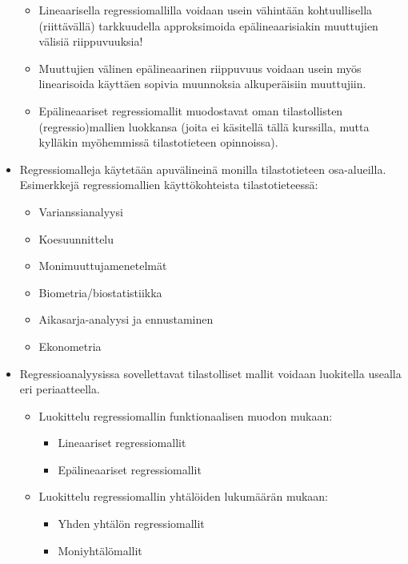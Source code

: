 \documentclass[
]{book}
\providecommand{\tightlist}{%
  \setlength{\itemsep}{0pt}\setlength{\parskip}{0pt}}
\begin{document}
\begin{itemize}
  \begin{itemize}
  \tightlist
  \item
    Lineaarisella regressiomallilla voidaan usein vähintään kohtuullisella (riittävällä) tarkkuudella approksimoida epälineaarisiakin muuttujien välisiä riippuvuuksia!
  \item
    Muuttujien välinen epälineaarinen riippuvuus voidaan usein myös linearisoida käyttäen sopivia muunnoksia alkuperäisiin muuttujiin.
  \item
    Epälineaariset regressiomallit muodostavat oman tilastollisten (regressio)mallien luokkansa (joita ei käsitellä tällä kurssilla, mutta kylläkin myöhemmissä tilastotieteen opinnoissa).
  \end{itemize}
\item
  Regressiomalleja käytetään apuvälineinä monilla tilastotieteen osa-alueilla. Esimerkkejä regressiomallien käyttökohteista tilastotieteessä:

  \begin{itemize}
  \tightlist
  \item
    Varianssianalyysi
  \item
    Koesuunnittelu
  \item
    Monimuuttujamenetelmät
  \item
    Biometria/biostatistiikka
  \item
    Aikasarja-analyysi ja ennustaminen
  \item
    Ekonometria
  \end{itemize}
\item
  Regressioanalyysissa sovellettavat tilastolliset mallit voidaan luokitella usealla eri periaatteella.

  \begin{itemize}
  \tightlist
  \item
    Luokittelu regressiomallin funktionaalisen muodon mukaan:

    \begin{itemize}
    \tightlist
    \item
      Lineaariset regressiomallit
    \item
      Epälineaariset regressiomallit
    \end{itemize}
  \item
    Luokittelu regressiomallin yhtälöiden lukumäärän mukaan:

    \begin{itemize}
    \tightlist
    \item
      Yhden yhtälön regressiomallit
    \item
      Moniyhtälömallit
    \end{itemize}
  \end{itemize}
\end{itemize}
\end{document}
